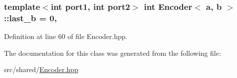 \hypertarget{classEncoder_a5a4bc2fcd23a97e69a47ecf3cd6e0914}{
\subsubsection[{last\-\_\-b}]{\setlength{\rightskip}{0pt plus 5cm}template$<$int port1, int port2$>$ int {\bf Encoder}$<$ a, b $>$\-::last\-\_\-b = 0\hspace{0.3cm}{\ttfamily [static]}, {\ttfamily [private]}}}\label{classEncoder_a5a4bc2fcd23a97e69a47ecf3cd6e0914}


Definition at line 60 of file Encoder.\-hpp.



The documentation for this class was generated from the following file\-:\begin{DoxyCompactItemize}
\item 
src/shared/\hyperlink{Encoder_8hpp}{Encoder.\-hpp}\end{DoxyCompactItemize}
